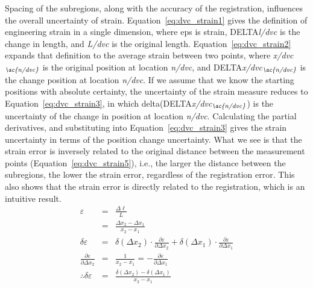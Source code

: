Spacing of the subregions, along with the accuracy of the registration, influences the overall uncertainty of strain.
Equation~\ref{eq:dvc_strain1} gives the definition of engineering strain in a single dimension, where \ac{eps} is strain, \ac{DELTA}\textit{\ac{l/dvc}} is the change in length, and \textit{\ac{L/dvc}} is the original length.
Equation~\ref{eq:dvc_strain2} expands that definition to the average strain between two points, where \textit{\ac{x/dvc}}$_{\textit{\ac{n/dvc}}}$ is the original position at location \textit{\ac{n/dvc}}, and \ac{DELTA}\textit{\ac{x/dvc}}$_{\textit{\ac{n/dvc}}}$ is the change position at location \textit{\ac{n/dvc}}.
If we assume that we know the starting positions with absolute certainty, the uncertainty of the strain measure reduces to Equation~\ref{eq:dvc_strain3}, in which \ac{delta}(\ac{DELTA}\textit{\ac{x/dvc}}$_{\textit{\ac{n/dvc}}}$) is the uncertainty of the change in position at location \textit{\ac{n/dvc}}.
Calculating the partial derivatives, and substituting into Equation~\ref{eq:dvc_strain3} gives the strain uncertainty in terms of the position change uncertainty.
What we see is that the strain error is inversely related to the original distance between the measurement points (Equation~\ref{eq:dvc_strain5}), i.e., the larger the distance between the subregions, the lower the strain error, regardless of the registration error.
This also shows that the strain error is directly related to the registration, which is an intuitive result.
\vspace{-1EX}
\begin{eqnarray}
\varepsilon &=& \frac{\Delta\ell}{L} \label{eq:dvc_strain1} \\
			&=& \frac{\Delta x_2 - \Delta x_1}{x_2-x_1} \label{eq:dvc_strain2} \\
\delta\varepsilon &=& \delta(\Delta x_2) \cdot \frac{\partial\varepsilon}{\partial\Delta x_2} + \delta(\Delta x_1) \cdot \frac{\partial\varepsilon}{\partial\Delta x_1}\label{eq:dvc_strain3}\\
\frac{\partial\varepsilon}{\partial\Delta x_2} &=& \frac{1}{x_2-x_1}\label{eq:dvc_strain4}  = -\frac{\partial\varepsilon}{\partial\Delta x_1}\\
\therefore \delta\varepsilon &=& \frac{\delta(\Delta x_2) - \delta(\Delta x_1)}{x_2-x_1}\label{eq:dvc_strain5}
\end{eqnarray}

